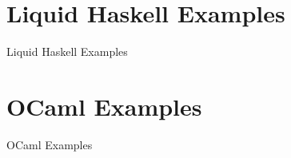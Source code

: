 \section{Liquid Haskell Examples}
\begin{frame}{Liquid Haskell Examples}
\end{frame}

\section{OCaml Examples}
\begin{frame}{OCaml Examples}
\end{frame}